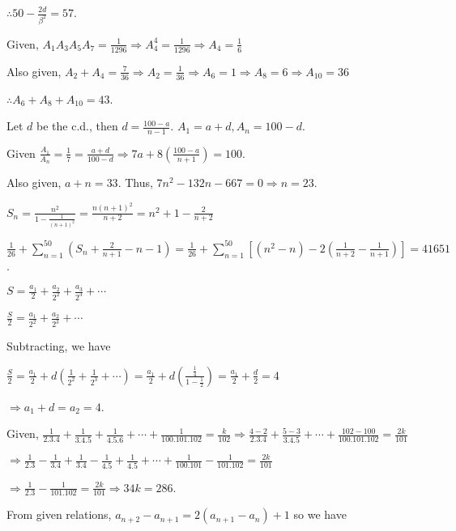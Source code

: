   $\therefore 50 - \frac{2d}{\beta^2} = 57$.
\item Given, $A_1A_3A_5A_7 = \frac{1}{1296}\Rightarrow A_4^4 = \frac{1}{1296}\Rightarrow A_4 = \frac{1}{6}$

  Also given, $A_2 + A_4 = \frac{7}{36}\Rightarrow A_2 = \frac{1}{36}\Rightarrow A_6 = 1\Rightarrow A_8 = 6
  \Rightarrow A_{10} = 36$

  $\therefore A_6 + A_8 + A_{10} = 43$.
\item Let $d$ be the c.d., then $d = \frac{100 - a}{n - 1}$. $A_1 = a + d, A_n = 100 - d$.

  Given $\frac{A_1}{A_n} = \frac{1}{7} = \frac{a + d}{100 - d}\Rightarrow 7a + 8\left(\frac{100 - a}{n +
    1}\right) = 100$.

  Also given, $a + n = 33$. Thus, $7n^2 - 132n - 667 = 0\Rightarrow n = 23$.
\item $S_n = \frac{n^2}{1 - \frac{1}{(n + 1)^2}} = \frac{n(n + 1)^2}{n + 2} = n^2 + 1 - \frac{2}{n + 2}$

  $\frac{1}{26} + \displaystyle\sum_{n = 1}^{50}\left(S_n + \frac{2}{n + 1} - n - 1\right) = \frac{1}{26} +
  \sum_{n = 1}^{50}\left[(n^2 - n) - 2\left(\frac{1}{n + 2} - \frac{1}{n + 1}\right)\right] = 41651$.
\item $S = \frac{a_1}{2} + \frac{a_2}{2^2} + \frac{a_3}{2^3} + \cdots$

  $\frac{S}{2} = \frac{a_1}{2^2} + \frac{a_2}{2^3} + \cdots$

  Subtracting, we have

  $\frac{S}{2} = \frac{a_1}{2} + d\left(\frac{1}{2^2} + \frac{1}{2^3} + \cdots\right) = \frac{a_1}{2} +
  d\left(\frac{\frac{1}{4}}{1 - \frac{1}{2}}\right) = \frac{a_1}{2} + \frac{d}{2} = 4$

  $\Rightarrow a_1 + d = a_2 = 4$.
\item Given, $\frac{1}{2.3.4} + \frac{1}{3.4.5} + \frac{1}{4.5.6} + \cdots + \frac{1}{100.101.102}
  = \frac{k}{102}\Rightarrow \frac{4 - 2}{2.3.4} + \frac{5 - 3}{3.4.5} + \cdots + \frac{102 -
    100}{100.101.102} = \frac{2k}{101}$

  $\Rightarrow \frac{1}{2.3} - \frac{1}{3.4}+ \frac{1}{3.4} - \frac{1}{4.5} + \frac{1}{4.5} + \cdots
  + \frac{1}{100.101} - \frac{1}{101.102} = \frac{2k}{101}$

  $\Rightarrow \frac{1}{2.3} - \frac{1}{101.102} = \frac{2k}{101}\Rightarrow 34k = 286$.
\item From given relations, $a_{n + 2} - a_{n + 1} = 2(a_{n + 1} - a_n) + 1$ so we have

